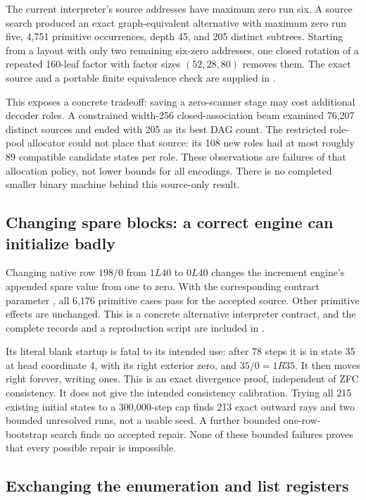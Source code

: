\documentclass[11pt]{article}
\newcommand{\file}[1]{\texttt{\detokenize{#1}}}
\begin{document}
The current interpreter's source addresses have maximum zero run six.
A source search produced an exact graph-equivalent alternative with
maximum zero run five, 4,751 primitive occurrences, depth 45, and 205
distinct subtrees. Starting from a layout with only two remaining
six-zero addresses, one closed rotation of a repeated 160-leaf factor
with factor sizes $(52,28,80)$ removes them. The exact source and a
portable finite equivalence check are supplied in \file{research/source/}.

This exposes a concrete tradeoff: saving a zero-scanner stage may cost
additional decoder roles. A constrained width-256 closed-association
beam examined 76,207 distinct sources and ended with 205 as its best
DAG count. The restricted role-pool allocator could not place that
source: its 108 new roles had at most roughly 89 compatible candidate
states per role. These observations are failures of that allocation
policy, not lower bounds for all encodings. There is no completed
smaller binary machine behind this source-only result.

\subsection{Changing spare blocks: a correct engine can initialize badly}

Changing native row $198/0$ from $1L40$ to $0L40$ changes the increment
engine's appended spare value from one to zero. With the corresponding
contract parameter \file{append=0}, all 6,176 primitive cases pass for
the accepted source. Other primitive effects are unchanged. This is a
concrete alternative interpreter contract, and the complete records and
a reproduction script are included in \file{research/spares/}.

Its literal blank startup is fatal to its intended use: after 78 steps
it is in state 35 at head coordinate 4, with its right exterior zero,
and $35/0=1R35$. It then moves right forever, writing ones. This is an
exact divergence proof, independent of ZFC consistency. It does not give
the intended consistency calibration. Trying all 215 existing initial
states to a 300,000-step cap finds 213 exact outward rays and two
bounded unresolved runs, not a usable seed. A further bounded
one-row-bootstrap search finds no accepted repair. None of these
bounded failures proves that every possible repair is impossible.

\subsection{Exchanging the enumeration and list registers}
\end{document}
